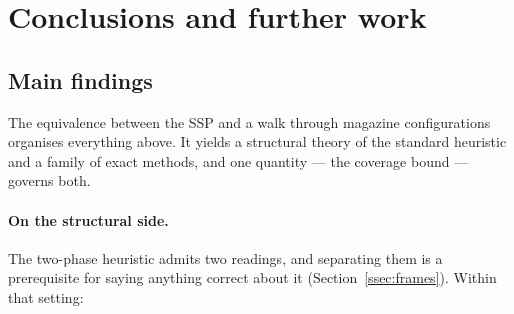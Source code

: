 \section{Conclusions and further work}\label{sec:concl}

\subsection{Main findings}\label{ssec:concl-summary}

The equivalence between the SSP and a walk through magazine configurations organises
everything above. It yields a structural theory of the standard heuristic and a family
of exact methods, and one quantity --- the coverage bound --- governs both.

\paragraph{On the structural side.}
The two-phase heuristic admits two readings, and separating them is a prerequisite for
saying anything correct about it (Section~\ref{ssec:frames}). Within that setting:

